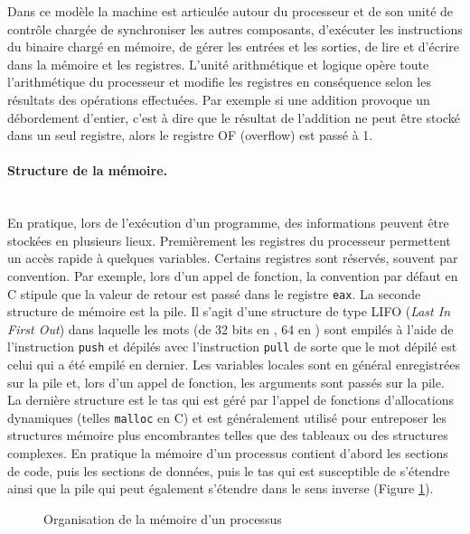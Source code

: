 Dans ce modèle la machine est articulée autour du processeur et de son unité de contrôle chargée de synchroniser les autres composants, d'exécuter les instructions du binaire chargé en mémoire, de gérer les entrées et les sorties, de lire et d'écrire dans la mémoire et les registres. L'unité arithmétique et logique opère toute l'arithmétique du processeur et modifie les registres en conséquence selon les résultats des opérations effectuées. Par exemple si une addition provoque un débordement d'entier, c'est à dire que le résultat de l'addition ne peut être stocké dans un seul registre, alors le registre OF (overflow) est passé à 1.

\paragraph{Structure de la mémoire.}~\\
En pratique, lors de l'exécution d'un programme, des informations peuvent être stockées en plusieurs lieux. 
Premièrement les registres du processeur permettent un accès rapide à quelques variables.
Certains registres sont réservés, souvent par convention. Par exemple, lors d'un appel de fonction, la convention par défaut en C  stipule que la valeur de retour est passé dans le registre \texttt{eax}.
La seconde structure de mémoire est la pile. 
Il s'agit d'une structure de type LIFO (\emph{Last In First Out}) dans laquelle les mots (de 32 bits en \xq, 64 en \xs) sont empilés à l'aide de l'instruction \texttt{push} et dépilés avec l'instruction \texttt{pull} de sorte que le mot dépilé est celui qui a été empilé en dernier.
Les variables locales sont en général enregistrées sur la pile et, lors d'un appel de fonction, les arguments sont passés sur la pile.
La dernière structure est le tas qui est géré par l'appel de fonctions d'allocations dynamiques (telles \texttt{malloc} en C) et est généralement utilisé pour entreposer les structures mémoire plus encombrantes telles que des tableaux ou des structures complexes.
En pratique la mémoire d'un processus contient d'abord les sections de code, puis les sections de données, puis le tas qui est susceptible de s'étendre ainsi que la pile qui peut également s'étendre dans le sens inverse (Figure \ref{fig:mem_process}).


\begin{figure}
\begin{center}
% 
\caption{Organisation de la mémoire d'un processus}
\label{fig:mem_process}
\end{center}
\end{figure}

